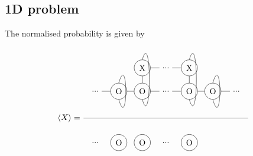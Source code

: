 \subsection{1D problem}

The normalised probability is given by
\begin{equation}
    \Braket{X} = \frac{
        \begin{tikzpicture} [   ]
            \clip (-1.5,-1) rectangle (5.5,2);

            \node[] (N0) at (-1,0) {...};
            \node[circle, draw] (N1) at (0,0) {O};
            \node[circle, draw] (N2) at (1,0) {O};
            \node[circle, draw] (X2) at (1,1) {X};

            \node[] (N3) at (2 ,0) {...};
            \node[] (X3) at (2,1) {...};

            \node[circle, draw] (N4) at (3 ,0) {O};
            \node[circle, draw] (X4) at (3,1) {X};

            \node[circle, draw] (N5) at (4 ,0) {O};
            \node[] (N6) at (5 ,0) {...};

            \draw  (N0) -- (N1) ;

            \draw  (N1) -- (N2) ;
            \draw  (N2) -- (N3) ;
            \draw  (N3) -- (N4) ;
            \draw  (N4) -- (N5) ;
            \draw  (N5) -- (N6) ;

            \draw  (X2) -- (X3) ;
            \draw  (X3) -- (X4) ;

            \draw  (N2) -- (X2) ;
            \draw  (N4) -- (X4) ;

            \draw (X2.north)   .. controls +(0.4,1.4) and +(0.4,-1.4) .. (N2.south);
            \draw (X4.north)   .. controls +(0.4,1.4) and +(0.4,-1.4) .. (N4.south);

            \draw (N1.north)   .. controls +(0.4,1.4) and +(0.4,-1.4) .. (N1.south);
            \draw (N5.north)   ..  controls +(0.4,1.4) and +(0.4,-1.4)  .. (N5.south);
        \end{tikzpicture}
    }{
        \begin{tikzpicture} [   ]

            \clip  (-1.5,-3) rectangle (5.5,-1);

            \node[] (O0) at (-1,-2) {...};
            \node[circle, draw] (O1) at (0,-2) {O};
            \node[circle, draw] (O2) at (1,-2) {O};

            \node[] (O3) at (2 ,-2) {...};
            \node[circle, draw] (O4) at (3 ,-2) {O};


\end{tikzpicture}}
\end{equation}
